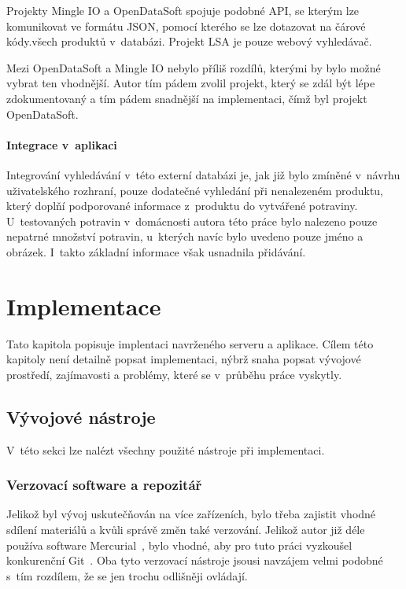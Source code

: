 \documentclass[thesis=B,czech]{FITthesis}[2013/10/20]
\begin{document}
Projekty Mingle IO a OpenDataSoft spojuje podobné API, se kterým lze komunikovat ve formátu JSON, pomocí kterého se lze dotazovat na čárové kódy.všech produktů v~databázi. Projekt LSA je pouze webový vyhledávač.

Mezi OpenDataSoft a Mingle IO nebylo příliš rozdílů, kterými by bylo možné vybrat ten vhodnější. Autor tím pádem zvolil projekt, který se zdál být lépe zdokumentovaný a tím pádem snadnější na implementaci, čímž byl projekt OpenDataSoft.

\subsubsection{Integrace v~aplikaci}

Integrování vyhledávání v~této externí databázi je, jak již bylo zmíněné v~návrhu uživatelského rozhraní, pouze dodatečné vyhledání při nenalezeném produktu, který doplňí podporované informace z~produktu do vytvářené potraviny. U~testovaných potravin v~domácnosti autora této práce bylo nalezeno pouze nepatrné množství potravin, u~kterých navíc bylo uvedeno pouze jméno a obrázek. I~takto základní informace však usnadnila přidávání.

\chapter{Implementace}

Tato kapitola popisuje implentaci navrženého serveru a aplikace. Cílem této kapitoly není detailně popsat implementaci, nýbrž snaha popsat vývojové prostředí, zajímavosti a problémy, které se v~průběhu práce vyskytly.

\section{Vývojové nástroje}
V~této sekci lze nalézt všechny použité nástroje při implementaci.

\subsection{Verzovací software a repozitář}

Jelikož byl vývoj uskutečňován na více zařízeních, bylo třeba zajistit vhodné sdílení materiálů a kvůli správě změn také verzování. Jelikož autor již déle používa software Mercurial~\cite{hg}, bylo vhodné, aby pro tuto práci vyzkoušel konkurenční Git~\cite{git}. Oba tyto verzovací nástroje jsousi navzájem velmi podobné s~tím rozdílem, že se jen trochu odlišněji ovládají.
\end{document}
